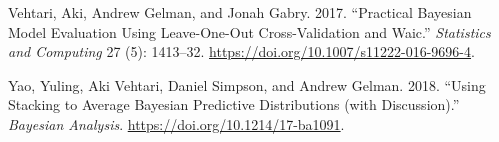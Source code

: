 \documentclass[10pt,a4paper,onecolumn]{article}
\newlength{\cslhangindent}
\newenvironment{cslreferences}%
  {\setlength{\parindent}{0pt}%
  \everypar{\setlength{\hangindent}{\cslhangindent}}\ignorespaces}%
  {\par}
\begin{document}
\begin{cslreferences}
\leavevmode\hypertarget{ref-vehtari2017}{}%
Vehtari, Aki, Andrew Gelman, and Jonah Gabry. 2017. ``Practical Bayesian
Model Evaluation Using Leave-One-Out Cross-Validation and Waic.''
\emph{Statistics and Computing} 27 (5): 1413--32.
\url{https://doi.org/10.1007/s11222-016-9696-4}.

\leavevmode\hypertarget{ref-Yao2018}{}%
Yao, Yuling, Aki Vehtari, Daniel Simpson, and Andrew Gelman. 2018.
``Using Stacking to Average Bayesian Predictive Distributions (with
Discussion).'' \emph{Bayesian Analysis}.
\url{https://doi.org/10.1214/17-ba1091}.
\end{cslreferences}
\end{document}
